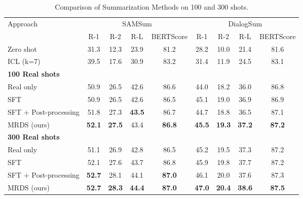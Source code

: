 
\begin{table*}[ht]
\centering
\caption{Comparison of Summarization Methods on 100 and 300 shots.}
\label{tab:summarization}
\begin{tabular}{lcccc|cccc}
\toprule
\multirow{2}{*}{Approach} & \multicolumn{4}{c}{SAMSum} & \multicolumn{4}{c}{DialogSum} \\
\cmidrule(lr){2-5} \cmidrule(lr){6-9}
& R-1 & R-2 & R-L & BERTScore & R-1 & R-2 & R-L & BERTScore \\
\midrule
Zero shot & 31.3 & 12.3 & 23.9 & 81.2 & 28.2 & 10.0 & 21.4 & 81.6\\
ICL (k=7) & 39.5 & 17.6 & 30.9 & 83.2 & 31.4 & 11.9 & 24.5 & 83.1\\
\midrule
\textbf{100 Real shots} \\
\midrule
Real only & 50.9 & 26.5 & 42.6 & 86.6 & 44.0 & 18.2 & 36.0 & 86.8 \\ 
SFT & 50.9 & 26.5 & 42.6 & 86.5 & 45.1 & 19.0 & 36.9 & 86.9 \\ 
SFT + Post-processing & 51.8 & 27.3 & \textbf{43.5} & 86.7 & 44.7 & 18.8 & 36.5 & 87.1 \\
MRDS (ours) & \textbf{52.1} & \textbf{27.5} & 43.4 & \textbf{86.8} & \textbf{45.5} & \textbf{19.3} & \textbf{37.2} & \textbf{87.2} \\
\midrule
\textbf{300 Real shots} \\
\midrule
Real only & 51.1 & 26.9 & 42.8 & 86.5 & 45.2 & 19.5 & 37.3 & 87.2 \\
SFT & 52.1 & 27.6 & 43.7 & 86.8 & 45.9 & 19.8 & 37.7 & 87.2 \\ 
SFT + Post-processing & \textbf{52.7} & 28.1 & 44.1 & \textbf{87.0} & 46.1 & 20.0 & 37.6 & 87.3 \\
MRDS (ours) & \textbf{52.7} & \textbf{28.3} & \textbf{44.4} & \textbf{87.0} & \textbf{47.0} & \textbf{20.4} & \textbf{38.6} & \textbf{87.5} \\

\bottomrule
\end{tabular}
\end{table*}

